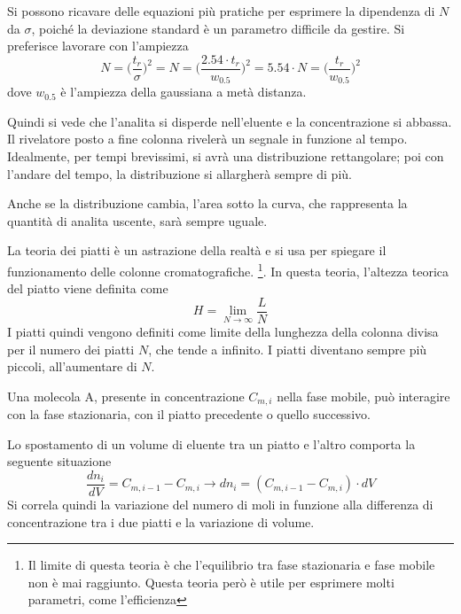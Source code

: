 Si possono ricavare delle equazioni più pratiche per esprimere la dipendenza di $N$ da $\sigma$, poiché la deviazione standard è un parametro difficile da gestire.
Si preferisce lavorare con l'ampiezza
\[
N = \biggl(\frac{t_r}{\sigma}\biggr)^2 = N = \biggl(\frac{2.54 \cdot t_r}{w_{0.5}}\biggr)^2 = 5.54 \cdot N = \biggl(\frac{t_r}{w_{0.5}}\biggr)^2
\]
dove $w_{0.5}$ è l'ampiezza della gaussiana a metà distanza.

Quindi si vede che l'analita si disperde nell'eluente e la concentrazione si abbassa. Il rivelatore posto a fine colonna rivelerà un segnale in funzione al tempo.
Idealmente, per tempi brevissimi, si avrà una distribuzione rettangolare; poi con l'andare del tempo, la distribuzione si allargherà sempre di più.

Anche se la distribuzione cambia, l'area sotto la curva, che rappresenta la quantità di analita uscente, sarà sempre uguale.

La teoria dei piatti è un astrazione della realtà e si usa per spiegare il funzionamento delle colonne cromatografiche.
	\footnote{Il limite di questa teoria è che l'equilibrio tra fase stazionaria e fase mobile non è mai raggiunto. 
		Questa teoria però è utile per esprimere molti parametri, come l'efficienza}.
In questa teoria, l'altezza teorica del piatto viene definita come
\[
H = \lim_{N \to \infty} \frac{L}{N}
\]
I piatti quindi vengono definiti come limite della lunghezza della colonna divisa per il numero dei piatti $N$, che tende a infinito.
I piatti diventano sempre più piccoli, all'aumentare di $N$.\par
Una molecola A, presente in concentrazione $C_{m,i}$ nella fase mobile, può interagire con la fase stazionaria, con il piatto precedente o quello successivo.


Lo spostamento di un volume di eluente tra un piatto e l'altro comporta la seguente situazione
\[
\frac{dn_i}{dV} = C_{m,i-1} - C_{m,i} \longrightarrow dn_i = (C_{m,i-1} - C_{m,i}) \cdot dV
\]
Si correla quindi la variazione del numero di moli in funzione alla differenza di concentrazione tra i due piatti e la variazione di volume.

